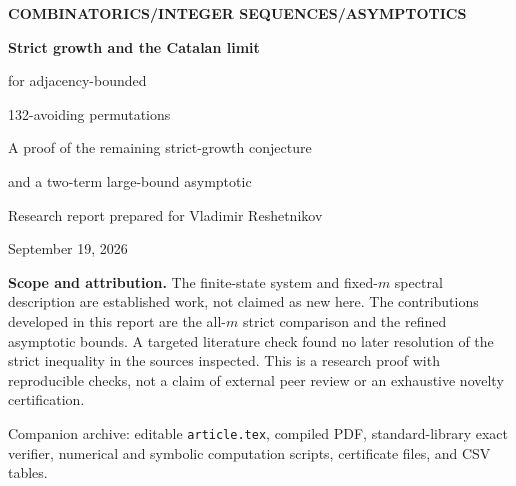 \documentclass[11pt,a4paper]{article}
\theoremstyle{definition}\newaliascnt{definition}{theorem}
\theoremstyle{remark}\newaliascnt{remark}{theorem}
\begin{document}
\thispagestyle{empty}
\begin{center}
{\small\sffamily\color{Forest}\bfseries COMBINATORICS\quad /\quad INTEGER SEQUENCES\quad /\quad ASYMPTOTICS}\par
\vspace{8mm}
{\LARGE\bfseries Strict growth and the Catalan limit\par
for adjacency-bounded\par
132-avoiding permutations}\par
\vspace{5mm}
{\large A proof of the remaining strict-growth conjecture\par
and a two-term large-bound asymptotic}\par
\vspace{5mm}
{\sffamily Research report prepared for Vladimir Reshetnikov}\par
{\small September 19, 2026}
\end{center}
\vspace{3mm}
\begin{abstract}
Let $a_n^{(m)}$ count permutations $\pi\in S_n$ avoiding the pattern $132$ and
satisfying $|\pi_{i+1}-\pi_i|\le m$. Nadler conjectured that their exponential
growth constants increase strictly from $1$ to $4$. Mayama and Akita established
a finite-state enumeration, the existence of the growth constants,
non-strict monotonicity, and convergence to $4$. We prove the missing strict
inequality for every adjacency bound. The argument embeds each of the two
irreducible cyclic state components at bound $m$ into a proper principal
submatrix of its counterpart at bound $m+1$ by increasing both finite endpoint
thresholds by one. Perron--Frobenius comparison then gives strict growth in
\emph{each} component, independently of which component dominates.

A separate counting argument gives
\[
 4-\alpha_m=\frac{2\log m+4\log\log m+O(1)}{m}.
\]
It compares the full class with a scalar Catalan majorant and an injectively
encoded family of variable-length skew blocks. A truncated-series root lemma
also bounds the possible constant term. Complete proofs, exact generating
functions for $m\le4$, integer sequences, and independently checked rational
Perron certificates accompany the report.
\end{abstract}
\begin{resultbox}
\textbf{Scope and attribution.}
The finite-state system and fixed-$m$ spectral description are established
work, not claimed as new here. The contributions developed in this report
are the all-$m$ strict comparison and the refined asymptotic bounds. A targeted
literature check found no later resolution of the strict inequality in the
sources inspected. This is a research proof with reproducible checks, not a
claim of external peer review or an exhaustive novelty certification.
\end{resultbox}
\vfill
{\small\sffamily\color{InkGray}Companion archive: editable \texttt{article.tex}, compiled PDF,
standard-library exact verifier, numerical and symbolic computation scripts,
certificate files, and CSV tables.}
\newpage
\tableofcontents
\newpage
\end{document}

